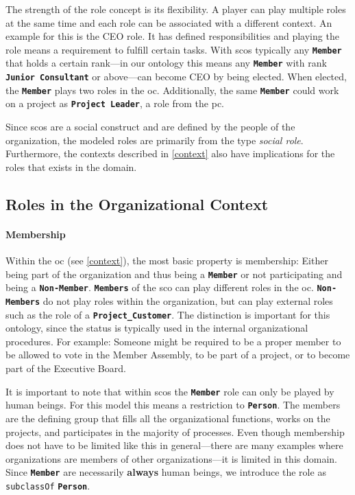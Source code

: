 \documentclass[a4paper, DIV=13, BCOR=0cm]{scrbook}
\newcommand{\class}[1]{\texttt{\textbf{#1}}}
\newcommand{\relation}[1]{\texttt{#1}}
\begin{document}
The strength of the role concept is its flexibility. A player can play multiple roles at the same time and each role can be associated with a different context. An example for this is the CEO role. It has defined responsibilities and playing the role means a requirement to fulfill certain tasks. With \glspl{sco} typically any \class{Member} that holds a certain rank---in our ontology this means any \class{Member} with rank \class{Junior Consultant} or above---can become CEO by being elected. When elected, the \class{Member} plays two roles in the \gls{oc}. Additionally, the same \class{Member} could work on a project as \class{Project Leader}, a role from the \gls{pc}.

Since \glspl{sco} are a social construct and are defined by the people of the organization, the modeled roles are primarily from the type \textit{social role}. Furthermore, the contexts described in \autoref{context} also have implications for the roles that exists in the domain.

\subsection{Roles in the Organizational Context}

\paragraph{Membership}
\label{membership}
Within the \gls{oc} (see \autoref{context}), the most basic property is membership: Either being part of the organization and thus being a \class{Member} or not participating and being a \class{Non-Member}. \class{Members} of the \gls{sco} can play different roles in the \gls{oc}. \class{Non-Members} do not play roles within the organization, but can play external roles such as the role of a \class{Project\_Customer}. The distinction is important for this ontology, since the status is typically used in the internal organizational procedures. For example: Someone might be required to be a proper member to be allowed to vote in the Member Assembly, to be part of a project, or to become part of the Executive Board.

It is important to note that within \glspl{sco} the \class{Member} role can only be played by human beings. For this model this means a restriction to \class{Person}. The members are the defining group that fills all the organizational functions, works on the projects, and participates in the majority of processes. Even though membership does not have to be limited like this in general---there are many examples where organizations are members of other organizations---it is limited in this domain. Since \class{Member} are necessarily \textbf{always} human beings, we introduce the role as \relation{subclassOf} \class{Person}.
\end{document}
